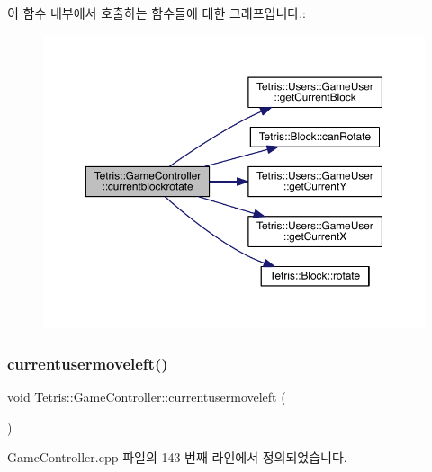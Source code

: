 이 함수 내부에서 호출하는 함수들에 대한 그래프입니다.\+:
\nopagebreak
\begin{figure}[H]
\begin{center}
\leavevmode
\includegraphics[width=350pt]{class_tetris_1_1_game_controller_a5d93facb945f87ba33fb8be74df023fa_cgraph}
\end{center}
\end{figure}
\mbox{\label{class_tetris_1_1_game_controller_ac0d40a0936505754131099034b4271fa}} 
\subsubsection{\texorpdfstring{currentusermoveleft()}{currentusermoveleft()}\hspace{0.1cm}{\footnotesize\ttfamily [1/2]}}
{\footnotesize\ttfamily void Tetris\+::\+Game\+Controller\+::currentusermoveleft (\begin{DoxyParamCaption}{ }\end{DoxyParamCaption})}



Game\+Controller.\+cpp 파일의 143 번째 라인에서 정의되었습니다.

